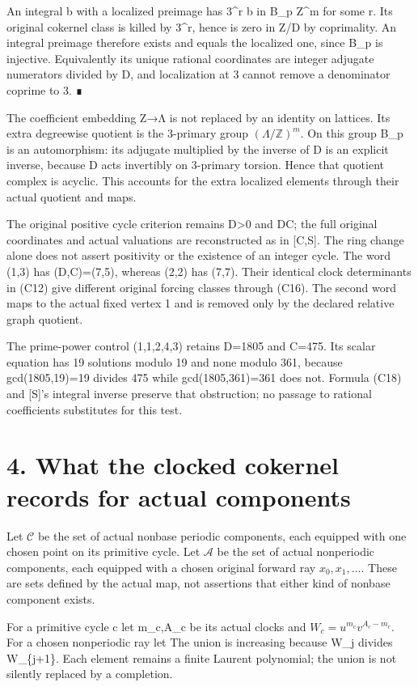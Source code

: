 An integral b with a localized preimage has 3\^{}r b in B\_p Z\^{}m for
some r. Its original cokernel class is killed by 3\^{}r, hence is zero
in Z/D by coprimality. An integral preimage therefore exists and equals
the localized one, since B\_p is injective. Equivalently its unique
rational coordinates are integer adjugate numerators divided by D, and
localization at 3 cannot remove a denominator coprime to 3. ∎

The coefficient embedding Z→Λ is not replaced by an identity on
lattices. Its extra degreewise quotient is the 3-primary group
\((\Lambda/\mathbb Z)^m\). On this group B\_p is an automorphism: its
adjugate multiplied by the inverse of D is an explicit inverse, because
D acts invertibly on 3-primary torsion. Hence that quotient complex is
acyclic. This accounts for the extra localized elements through their
actual quotient and maps.

The original positive cycle criterion remains D\textgreater0 and
D\textbar C; the full original coordinates and actual valuations are
reconstructed as in {[}C,S{]}. The ring change alone does not assert
positivity or the existence of an integer cycle. The word (1,3) has
(D,C)=(7,5), whereas (2,2) has (7,7). Their identical clock determinants
in (C12) give different original forcing classes through (C16). The
second word maps to the actual fixed vertex 1 and is removed only by the
declared relative graph quotient.

The prime-power control (1,1,2,4,3) retains D=1805 and C=475. Its scalar
equation has 19 solutions modulo 19 and none modulo 361, because
gcd(1805,19)=19 divides 475 while gcd(1805,361)=361 does not. Formula
(C18) and {[}S{]}'s integral inverse preserve that obstruction; no
passage to rational coefficients substitutes for this test.

\section{4. What the clocked cokernel records for actual components}

Let \(\mathscr C\) be the set of actual nonbase periodic components,
each equipped with one chosen point on its primitive cycle. Let
\(\mathscr A\) be the set of actual nonperiodic components, each
equipped with a chosen original forward ray \(x_0,x_1,\ldots\). These
are sets defined by the actual map, not assertions that either kind of
nonbase component exists.

For a primitive cycle c let m\_c,A\_c be its actual clocks and
\(W_c=u^{m_c}v^{A_c-m_c}\). For a chosen nonperiodic ray let
 The union is increasing
because W\_j divides W\_\{j+1\}. Each element remains a finite Laurent
polynomial; the union is not silently replaced by a completion.

